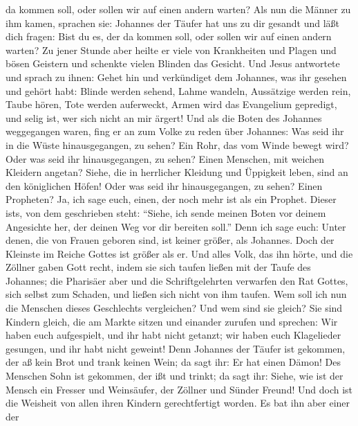 da kommen soll, oder sollen wir auf einen andern warten? 
Als nun die Männer zu ihm kamen, sprachen sie: Johannes der Täufer hat
uns zu dir gesandt und läßt dich fragen: Bist du es, der da kommen soll,
oder sollen wir auf einen andern warten?  Zu jener Stunde
aber heilte er viele von Krankheiten und Plagen und bösen Geistern und
schenkte vielen Blinden das Gesicht.  Und Jesus
antwortete und sprach zu ihnen: Gehet hin und verkündiget dem Johannes,
was ihr gesehen und gehört habt: Blinde werden sehend, Lahme wandeln,
Aussätzige werden rein, Taube hören, Tote werden auferweckt, Armen wird
das Evangelium gepredigt,  und selig ist, wer sich nicht
an mir ärgert!  Und als die Boten des Johannes
weggegangen waren, fing er an zum Volke zu reden über Johannes: Was seid
ihr in die Wüste hinausgegangen, zu sehen? Ein Rohr, das vom Winde
bewegt wird?  Oder was seid ihr hinausgegangen, zu sehen?
Einen Menschen, mit weichen Kleidern angetan? Siehe, die in herrlicher
Kleidung und Üppigkeit leben, sind an den königlichen Höfen!
 Oder was seid ihr hinausgegangen, zu sehen? Einen
Propheten? Ja, ich sage euch, einen, der noch mehr ist als ein Prophet.
 Dieser ist\textquotesingle s, von dem geschrieben steht:
``Siehe, ich sende meinen Boten vor deinem Angesichte her, der deinen
Weg vor dir bereiten soll.''  Denn ich sage euch: Unter
denen, die von Frauen geboren sind, ist keiner größer, als Johannes.
Doch der Kleinste im Reiche Gottes ist größer als er. 
Und alles Volk, das ihn hörte, und die Zöllner gaben Gott recht, indem
sie sich taufen ließen mit der Taufe des Johannes;  die
Pharisäer aber und die Schriftgelehrten verwarfen den Rat Gottes, sich
selbst zum Schaden, und ließen sich nicht von ihm taufen.
 Wem soll ich nun die Menschen dieses Geschlechts
vergleichen? Und wem sind sie gleich?  Sie sind Kindern
gleich, die am Markte sitzen und einander zurufen und sprechen: Wir
haben euch aufgespielt, und ihr habt nicht getanzt; wir haben euch
Klagelieder gesungen, und ihr habt nicht geweint!  Denn
Johannes der Täufer ist gekommen, der aß kein Brot und trank keinen
Wein; da sagt ihr: Er hat einen Dämon!  Des Menschen Sohn
ist gekommen, der ißt und trinkt; da sagt ihr: Siehe, wie ist der Mensch
ein Fresser und Weinsäufer, der Zöllner und Sünder Freund!
 Und doch ist die Weisheit von allen ihren Kindern
gerechtfertigt worden.  Es bat ihn aber einer der
